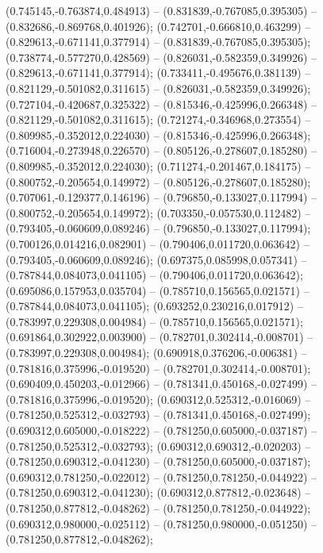  (0.745145,-0.763874,0.484913) -- (0.831839,-0.767085,0.395305) -- (0.832686,-0.869768,0.401926);
 (0.742701,-0.666810,0.463299) -- (0.829613,-0.671141,0.377914) -- (0.831839,-0.767085,0.395305);
 (0.738774,-0.577270,0.428569) -- (0.826031,-0.582359,0.349926) -- (0.829613,-0.671141,0.377914);
 (0.733411,-0.495676,0.381139) -- (0.821129,-0.501082,0.311615) -- (0.826031,-0.582359,0.349926);
 (0.727104,-0.420687,0.325322) -- (0.815346,-0.425996,0.266348) -- (0.821129,-0.501082,0.311615);
 (0.721274,-0.346968,0.273554) -- (0.809985,-0.352012,0.224030) -- (0.815346,-0.425996,0.266348);
 (0.716004,-0.273948,0.226570) -- (0.805126,-0.278607,0.185280) -- (0.809985,-0.352012,0.224030);
 (0.711274,-0.201467,0.184175) -- (0.800752,-0.205654,0.149972) -- (0.805126,-0.278607,0.185280);
 (0.707061,-0.129377,0.146196) -- (0.796850,-0.133027,0.117994) -- (0.800752,-0.205654,0.149972);
 (0.703350,-0.057530,0.112482) -- (0.793405,-0.060609,0.089246) -- (0.796850,-0.133027,0.117994);
 (0.700126,0.014216,0.082901) -- (0.790406,0.011720,0.063642) -- (0.793405,-0.060609,0.089246);
 (0.697375,0.085998,0.057341) -- (0.787844,0.084073,0.041105) -- (0.790406,0.011720,0.063642);
 (0.695086,0.157953,0.035704) -- (0.785710,0.156565,0.021571) -- (0.787844,0.084073,0.041105);
 (0.693252,0.230216,0.017912) -- (0.783997,0.229308,0.004984) -- (0.785710,0.156565,0.021571);
 (0.691864,0.302922,0.003900) -- (0.782701,0.302414,-0.008701) -- (0.783997,0.229308,0.004984);
 (0.690918,0.376206,-0.006381) -- (0.781816,0.375996,-0.019520) -- (0.782701,0.302414,-0.008701);
 (0.690409,0.450203,-0.012966) -- (0.781341,0.450168,-0.027499) -- (0.781816,0.375996,-0.019520);
 (0.690312,0.525312,-0.016069) -- (0.781250,0.525312,-0.032793) -- (0.781341,0.450168,-0.027499);
 (0.690312,0.605000,-0.018222) -- (0.781250,0.605000,-0.037187) -- (0.781250,0.525312,-0.032793);
 (0.690312,0.690312,-0.020203) -- (0.781250,0.690312,-0.041230) -- (0.781250,0.605000,-0.037187);
 (0.690312,0.781250,-0.022012) -- (0.781250,0.781250,-0.044922) -- (0.781250,0.690312,-0.041230);
 (0.690312,0.877812,-0.023648) -- (0.781250,0.877812,-0.048262) -- (0.781250,0.781250,-0.044922);
 (0.690312,0.980000,-0.025112) -- (0.781250,0.980000,-0.051250) -- (0.781250,0.877812,-0.048262);
